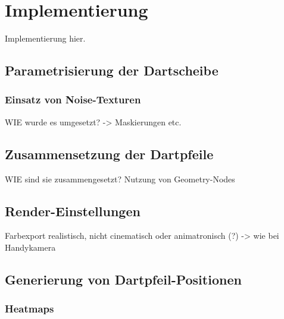 
\section{Implementierung}
\label{sec:daten:implementierung}

Implementierung hier.


\subsection{Parametrisierung der Dartscheibe}  %
\label{sec:dartscheibe_parametrisierung}

\subsubsection{Einsatz von Noise-Texturen}

WIE wurde es umgesetzt? -> Maskierungen etc.

\todo{}

\subsection{Zusammensetzung der Dartpfeile}  %
\label{sec:dartpfeile_zusammensetzung}

WIE sind sie zusammengesetzt? Nutzung von Geometry-Nodes

\todo{}

\subsection{Render-Einstellungen}  %
\label{sec:render_einstellungen}

Farbexport realistisch, nicht cinematisch oder animatronisch (?) -> wie bei Handykamera

\todo{}

\subsection{Generierung von Dartpfeil-Positionen}  %
\label{sec:wie_dartpfeil_positionen}

\subsubsection{Heatmaps}
\label{sec:heatmaps}

